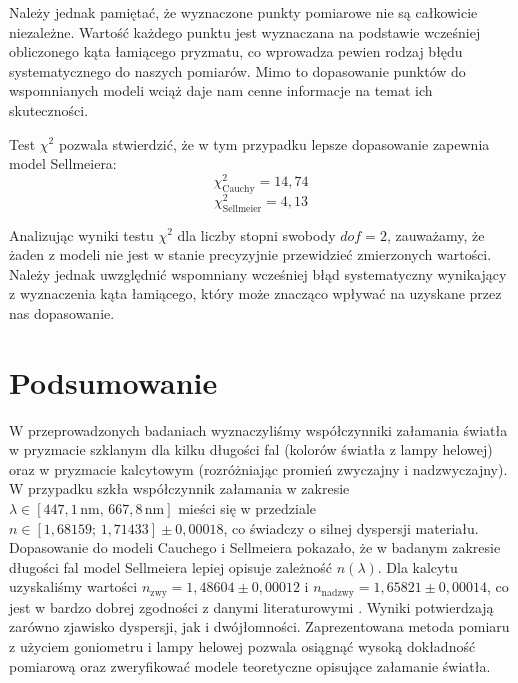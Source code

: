 \documentclass[12pt]{article}
\begin{document}
Należy jednak pamiętać, że wyznaczone punkty pomiarowe nie są całkowicie niezależne.
Wartość każdego punktu jest wyznaczana na podstawie wcześniej obliczonego kąta łamiącego pryzmatu, co wprowadza pewien rodzaj błędu systematycznego do naszych pomiarów.
Mimo to dopasowanie punktów do wspomnianych modeli wciąż daje nam cenne informacje na temat ich skuteczności.

Test $\chi^2$ pozwala stwierdzić, że w tym przypadku lepsze dopasowanie zapewnia model Sellmeiera:
\[
    \chi^{2}_{\text{Cauchy}} = 14{,}74
\]
\[
    \chi^{2}_{\text{Sellmeier}} = 4{,}13
\]

Analizując wyniki testu $\chi^2$ dla liczby stopni swobody $dof=2$, zauważamy, że żaden z modeli nie jest w stanie precyzyjnie przewidzieć zmierzonych wartości. 
Należy jednak uwzględnić wspomniany wcześniej błąd systematyczny wynikający z wyznaczenia kąta łamiącego, który może znacząco wpływać na uzyskane przez nas dopasowanie.


\newpage

\section{Podsumowanie}
W przeprowadzonych badaniach wyznaczyliśmy współczynniki załamania światła w pryzmacie szklanym dla kilku długości fal (kolorów światła z lampy helowej) oraz w pryzmacie kalcytowym (rozróżniając promień zwyczajny i nadzwyczajny).  
W przypadku szkła współczynnik załamania w zakresie $\lambda \in [447{,}1\,\mathrm{nm},\,667{,}8\,\mathrm{nm}]$ mieści się w przedziale $n \in [1{,}68159;\,1{,}71433] \pm 0{,}00018$, co świadczy o silnej dyspersji materiału.
Dopasowanie do modeli Cauchego i Sellmeiera pokazało, że w badanym zakresie długości fal model Sellmeiera lepiej opisuje zależność $n(\lambda)$.  
Dla kalcytu uzyskaliśmy wartości $n_{\mathrm{zwy}} = 1{,}48604 \pm 0{,}00012$ i $n_{\mathrm{nadzwy}} = 1{,}65821 \pm 0{,}00014$, co jest w bardzo dobrej zgodności z danymi literaturowymi \cite{kalcyt}.  
Wyniki potwierdzają zarówno zjawisko dyspersji, jak i dwójłomności. Zaprezentowana metoda pomiaru z użyciem goniometru i lampy helowej pozwala osiągnąć wysoką dokładność pomiarową oraz zweryfikować modele teoretyczne opisujące załamanie światła.
\end{document}
